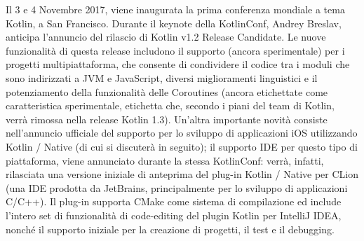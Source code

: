Il 3 e 4 Novembre 2017, viene inaugurata la prima conferenza mondiale a tema Kotlin, a San Francisco. Durante il keynote \cite{kotlinKeynoteRecap} della KotlinConf, Andrey Breslav, anticipa l’annuncio del rilascio di Kotlin v1.2 Release Candidate. Le nuove funzionalità di questa release includono il supporto (ancora sperimentale) per i progetti multipiattaforma, che consente di condividere il codice tra i moduli che sono indirizzati a JVM e JavaScript, diversi miglioramenti linguistici e il potenziamento della funzionalità delle Coroutines (ancora etichettate come caratteristica sperimentale, etichetta che, secondo i piani del team di Kotlin, verrà rimossa nella release Kotlin 1.3). Un'altra importante novità consiste nell'annuncio ufficiale del supporto per lo sviluppo di applicazioni iOS utilizzando Kotlin / Native \cite{kotlinNativeIDESupport} (di cui si discuterà in seguito); il supporto IDE per questo tipo di piattaforma, viene annunciato durante la stessa KotlinConf: verrà, infatti, rilasciata una versione iniziale di anteprima del plug-in Kotlin / Native per CLion (una IDE prodotta da JetBrains, principalmente per lo sviluppo di applicazioni C/C++). Il plug-in supporta CMake come sistema di compilazione ed include l'intero set di funzionalità di code-editing del plugin Kotlin per IntelliJ IDEA, nonché il supporto iniziale per la creazione di progetti, il test e il debugging.\\

